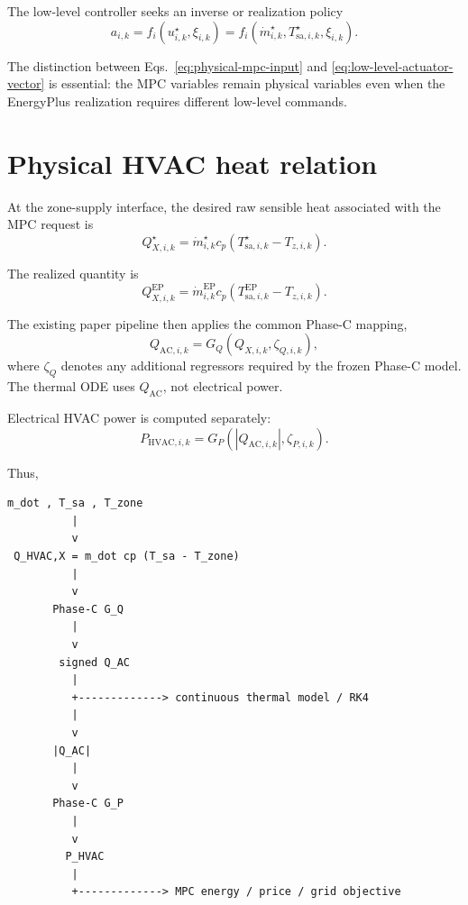 \documentclass[11pt]{article}
\newcommand{\mdot}{\dot m}
\newcommand{\Qac}{Q_{\mathrm{AC}}}
\begin{document}
The low-level controller seeks an inverse or realization policy
\begin{equation}
a_{i,k}
=
f_i
\left(
u_{i,k}^\star,\xi_{i,k}
\right)
=
f_i
\left(
\mdot_{i,k}^\star,
T_{\mathrm{sa},i,k}^\star,
\xi_{i,k}
\right).
\label{eq:inverse-realizer}
\end{equation}

The distinction between Eqs.~\eqref{eq:physical-mpc-input} and
\eqref{eq:low-level-actuator-vector} is essential: the MPC variables remain
physical variables even when the EnergyPlus realization requires different
low-level commands.

\section{Physical HVAC heat relation}

At the zone-supply interface, the desired raw sensible heat associated with the
MPC request is
\begin{equation}
Q_{X,i,k}^{\star}
=
\mdot_{i,k}^{\star}
c_p
\left(
T_{\mathrm{sa},i,k}^{\star}-T_{z,i,k}
\right).
\label{eq:desired-airside-heat}
\end{equation}

The realized quantity is
\begin{equation}
Q_{X,i,k}^{\mathrm{EP}}
=
\mdot_{i,k}^{\mathrm{EP}}
c_p
\left(
T_{\mathrm{sa},i,k}^{\mathrm{EP}}-T_{z,i,k}
\right).
\label{eq:realized-airside-heat}
\end{equation}

The existing paper pipeline then applies the common Phase-C mapping,
\begin{equation}
Q_{\mathrm{AC},i,k}
=
G_Q
\left(
Q_{X,i,k},\zeta_{Q,i,k}
\right),
\label{eq:phase-c-q-map}
\end{equation}
where $\zeta_Q$ denotes any additional regressors required by the frozen Phase-C
model.  The thermal ODE uses $\Qac$, not electrical power.

Electrical HVAC power is computed separately:
\begin{equation}
P_{\mathrm{HVAC},i,k}
=
G_P
\left(
|Q_{\mathrm{AC},i,k}|,\zeta_{P,i,k}
\right).
\label{eq:phase-c-p-map}
\end{equation}

Thus,
\begin{verbatim}
m_dot , T_sa , T_zone
          |
          v
 Q_HVAC,X = m_dot cp (T_sa - T_zone)
          |
          v
       Phase-C G_Q
          |
          v
        signed Q_AC
          |
          +-------------> continuous thermal model / RK4
          |
          v
       |Q_AC|
          |
          v
       Phase-C G_P
          |
          v
         P_HVAC
          |
          +-------------> MPC energy / price / grid objective
\end{verbatim}
\end{document}
